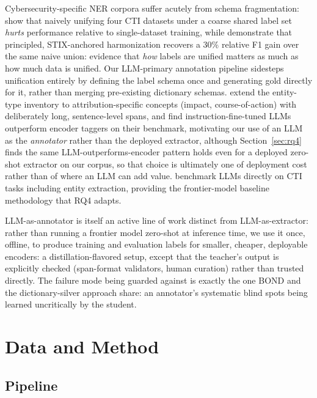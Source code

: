 \documentclass[11pt]{article}
\begin{document}
Cybersecurity-specific NER corpora suffer acutely from schema fragmentation:
\citet{schmidt2025labelunification} show that naively unifying four CTI
datasets under a coarse shared label set \emph{hurts} performance relative to
single-dataset training, while \citet{echchammakhy2025cyberner} demonstrate
that principled, STIX-anchored harmonization recovers a 30\% relative F1 gain
over the same naive union: evidence that \emph{how} labels are unified
matters as much as how much data is unified. Our LLM-primary annotation
pipeline sidesteps unification entirely by defining the label schema once and
generating gold directly for it, rather than merging pre-existing dictionary
schemas. \citet{deka2024attacker} extend the entity-type inventory to
attribution-specific concepts (impact, course-of-action) with deliberately
long, sentence-level spans, and find instruction-fine-tuned LLMs outperform
encoder taggers on their benchmark, motivating our use of an LLM as the
\emph{annotator} rather than the deployed extractor, although
Section~\ref{sec:rq4} finds the same LLM-outperforms-encoder pattern holds
even for a deployed zero-shot extractor on our corpus, so that choice is
ultimately one of deployment cost rather than of where an LLM can add value.
\citet{alam2024ctibench} benchmark LLMs directly on CTI tasks including
entity extraction, providing the frontier-model baseline methodology that
RQ4 adapts.

LLM-as-annotator is itself an active line of work distinct from
LLM-as-extractor: rather than running a frontier model zero-shot at inference
time, we use it once, offline, to produce training and evaluation labels for
smaller, cheaper, deployable encoders: a distillation-flavored setup, except
that the teacher's output is explicitly checked (span-format validators,
human curation) rather than trusted directly. The failure mode being guarded
against is exactly the one BOND and the dictionary-silver approach share: an
annotator's systematic blind spots being learned uncritically by the
student.

\section{Data and Method}
\label{sec:data-method}

\subsection{Pipeline}
\end{document}
